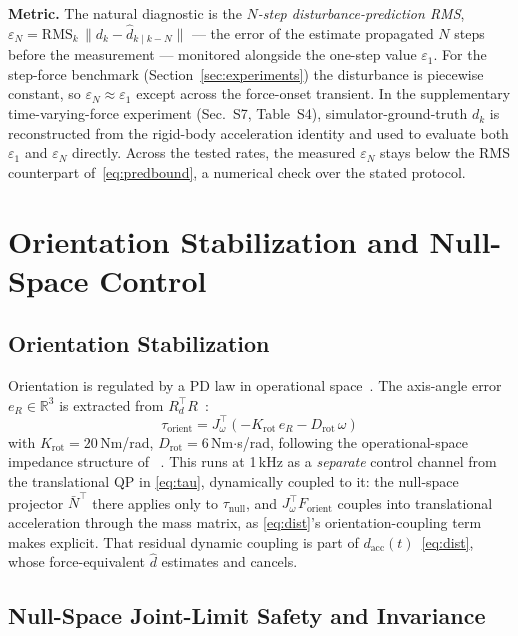 \documentclass[journal]{IEEEtran}
\newcommand{\dhat}{\hat{d}}
\begin{document}
\textbf{Metric.} The natural diagnostic is the \emph{$N$-step
disturbance-prediction RMS}, $\varepsilon_N=\mathrm{RMS}_k\,\|d_k-\dhat_{k\mid
k-N}\|$ --- the error of the estimate propagated $N$ steps before the
measurement --- monitored alongside the one-step value $\varepsilon_1$. For
the step-force benchmark (Section~\ref{sec:experiments}) the disturbance is
piecewise constant, so $\varepsilon_N\approx\varepsilon_1$ except across the
force-onset transient. In the supplementary time-varying-force experiment
(Sec.~S7, Table~S4), simulator-ground-truth $d_k$ is reconstructed from the
rigid-body acceleration identity and used to evaluate both $\varepsilon_1$
and $\varepsilon_N$ directly. Across the tested rates, the measured
$\varepsilon_N$ stays below the RMS counterpart of~\eqref{eq:predbound}, a
numerical check over the stated protocol.

\section{Orientation Stabilization and Null-Space Control}

\subsection{Orientation Stabilization}

Orientation is regulated by a PD law in operational
space~\cite{khatib1987unified}.
The axis-angle error $e_R\in\mathbb{R}^3$ is extracted from
$R_d^\top R$~\cite{siciliano2009robotics}:
\begin{equation}\label{eq:torient}
  \tau_{\text{orient}} = J_\omega^\top(-K_{\text{rot}}\,e_R - D_{\text{rot}}\,\omega)
\end{equation}
with $K_{\text{rot}}=20$\,Nm/rad, $D_{\text{rot}}=6$\,Nm$\cdot$s/rad,
following the operational-space impedance structure of~%
\cite{khatib1987unified,albu2007unified}.
This runs at 1\,kHz as a \emph{separate} control channel from the
translational QP in \eqref{eq:tau}, dynamically coupled to it:
the null-space projector $\bar N^\top$ there applies only to
$\tau_{\text{null}}$, and $J_\omega^\top F_{\text{orient}}$ couples
into translational acceleration through the mass matrix, as
\eqref{eq:dist}'s orientation-coupling term makes explicit. That residual
dynamic coupling is part of $d_{\text{acc}}(t)$~\eqref{eq:dist}, whose
force-equivalent $\dhat$ estimates and cancels.

\subsection{Null-Space Joint-Limit Safety and Invariance}\label{sec:cbf}
\end{document}
